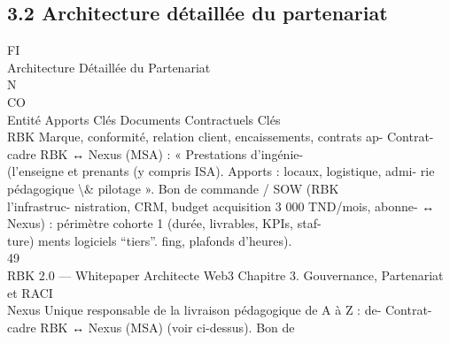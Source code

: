 \documentclass[12pt,landscape,a4paper]{article}
\begin{document}
\subsection{3.2 Architecture détaillée du partenariat}
\vspace{0.5em}
\vspace{0.5em}
\vspace{0.5em}
\vspace{0.5em}
FI\\
Architecture Détaillée du Partenariat\\
\vspace{0.5em}
\vspace{0.5em}
\vspace{0.5em}
N\\
CO\\
Entité            Apports Clés                                                           Documents Contractuels Clés\\
\vspace{0.5em}
RBK               Marque, conformité, relation client, encaissements, contrats ap- Contrat-cadre RBK ↔ Nexus (MSA) : « Prestations d’ingénie-\\
(l’enseigne et    prenants (y compris ISA). Apports : locaux, logistique, admi- rie pédagogique \textbackslash{}& pilotage ». Bon de commande / SOW (RBK\\
l’infrastruc-     nistration, CRM, budget acquisition 3 000 TND/mois, abonne- ↔ Nexus) : périmètre cohorte 1 (durée, livrables, KPIs, staf-\\
ture)             ments logiciels “tiers”.                                         fing, plafonds d’heures).\\
\vspace{0.5em}
\vspace{0.5em}
\vspace{0.5em}
\vspace{0.5em}
49\\
RBK 2.0 — Whitepaper Architecte Web3                                                                            Chapitre 3. Gouvernance, Partenariat et RACI\\
\vspace{0.5em}
\vspace{0.5em}
\vspace{0.5em}
\vspace{0.5em}
Nexus             Unique responsable de la livraison pédagogique de A à Z : de- Contrat-cadre RBK ↔ Nexus (MSA) (voir ci-dessus). Bon de\\
\end{document}
